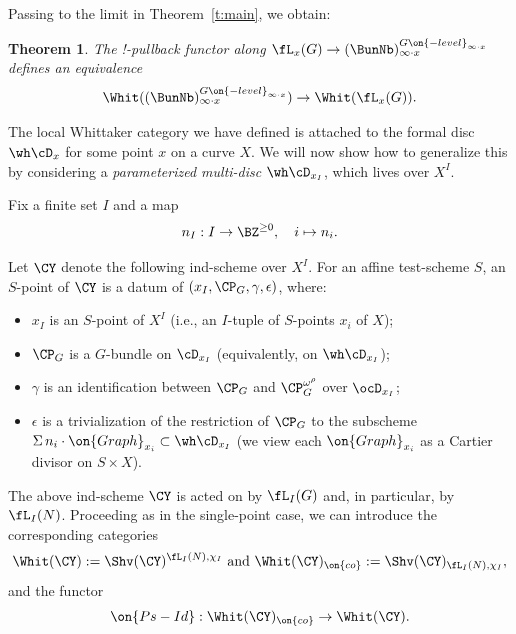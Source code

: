 \documentclass[9pt]{amsart}
\newtheorem{thm}[subsubsection]{Theorem}
\theoremstyle{definition}
\theoremstyle{remark}
\newcommand{\thmref}[1]{Theorem~\ref{#1}}
\numberwithin{equation}{section}
\begin{document}
Passing to the limit in \thmref{t:main}, we obtain:

\begin{thm}
The !-pullback functor along $\fL_x(G)\to (\BunNb)^{G\on{-level}_{\infty\cdot x}}_{\infty\cdot x}$ defines an equivalence
$$\Whit((\BunNb)^{G\on{-level}_{\infty\cdot x}}_{\infty\cdot x})\to \Whit(\fL_x(G)).$$
\end{thm}


The local Whittaker category we have defined is attached to the formal disc $\wh\cD_x$ for some point $x$ on a curve $X$. 
We will now show how to generalize this by considering a \emph{parameterized multi-disc} $\wh\cD_{x_I}$, which lives
over $X^I$. 

\sssec{}  \label{sss:multi}

Fix a finite set $I$ and a map 
$$n_I:I\to \BZ^{\geq 0}, \quad i\mapsto n_i.$$

Let $\CY$ denote the following ind-scheme over $X^I$. For an affine test-scheme $S$, an $S$-point of $\CY$ is a datum of
$(x_I,\CP_G,\gamma,\epsilon)$, where:

\begin{itemize}  

\item $x_I$ is an $S$-point of $X^I$ (i.e., an $I$-tuple of $S$-points $x_i$ of $X$);

\item $\CP_G$ is a $G$-bundle on $\cD_{x_I}$ (equivalently, on $\wh\cD_{x_I}$);

\item $\gamma$ is an identification between $\CP_G$ and $\CP_G^{\omega^\rho}$ over $\ocD_{x_I}$;

\item $\epsilon$ is a trivialization of the restriction of $\CP_G$ to the subscheme $\Sigma\, n_i\cdot \on{Graph}_{x_i}\subset \wh\cD_{x_I}$
(we view each $\on{Graph}_{x_i}$ as a Cartier divisor on $S\times X$). 

\end{itemize} 

\sssec{}

The above ind-scheme $\CY$ is acted on by $\fL_I(G)$ and, in particular, by $\fL_I(N)$. Proceeding as in the single-point case, we 
can introduce the corresponding categories
$$\Whit(\CY):=\Shv(\CY)^{\fL_I(N),\chi_I} \text{ and } \Whit(\CY)_{\on{co}}:=\Shv(\CY)_{\fL_I(N),\chi_I},$$
and the functor
\begin{equation} \label{e:Ps multi}
\on{Ps-Id}:\Whit(\CY)_{\on{co}}\to \Whit(\CY).
\end{equation} 
\end{document}
